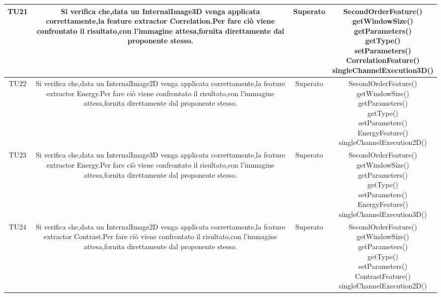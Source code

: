 \begin{center}
\begin{longtable}{|c|c|c|c|}
\hline
TU21 & \parbox[t]{\larghezza}{ Si verifica che,data un InternalImage3D venga applicata correttamente,la feature extractor Correlation.Per fare ciò viene confrontato il risultato,con l'immagine attesa,fornita direttamente dal proponente stesso. } & Superato & \parbox[t]{\dimTipo} { SecondOrderFeature() \\ getWindowSize() \\ getParameters() \\ getType() \\ setParameters()  \\ CorrelationFeature() \\ singleChannelExecution3D() \\ } \\
\hline
TU22 & \parbox[t]{\larghezza}{ Si verifica che,data un InternalImage2D venga applicata correttamente,la feature extractor Energy.Per fare ciò viene confrontato il risultato,con l'immagine attesa,fornita direttamente dal proponente stesso. } & Superato & \parbox[t]{\dimTipo} { SecondOrderFeature() \\ getWindowSize() \\ getParameters() \\ getType() \\ setParameters()  \\ EnergyFeature() \\ singleChannelExecution2D() \\ } \\
\hline
TU23 & \parbox[t]{\larghezza}{ Si verifica che,data un InternalImage3D venga applicata correttamente,la feature extractor Energy.Per fare ciò viene confrontato il risultato,con l'immagine attesa,fornita direttamente dal proponente stesso. } & Superato & \parbox[t]{\dimTipo} { SecondOrderFeature() \\ getWindowSize() \\ getParameters() \\ getType() \\ setParameters()  \\ EnergyFeature() \\ singleChannelExecution3D() \\ } \\
\hline
TU24 & \parbox[t]{\larghezza}{ Si verifica che,data un InternalImage2D venga applicata correttamente,la feature extractor Contrast.Per fare ciò viene confrontato il risultato,con l'immagine attesa,fornita direttamente dal proponente stesso. } & Superato & \parbox[t]{\dimTipo} { SecondOrderFeature() \\ getWindowSize() \\ getParameters() \\ getType() \\ setParameters()  \\ ContrastFeature() \\ singleChannelExecution2D() \\ } \\

\end{longtable}
\end{center}
